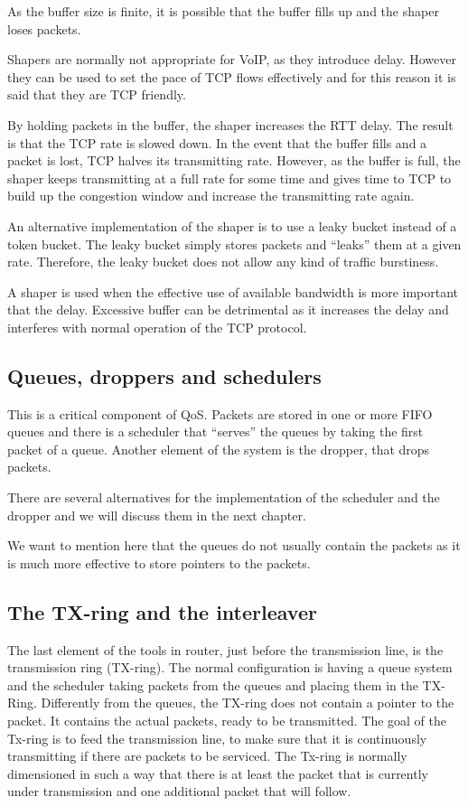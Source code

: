 As the buffer size is finite, it is possible that the buffer fills up and the shaper loses packets.

Shapers are normally not appropriate for VoIP, as they introduce delay.
However they can be used to set the pace of TCP flows effectively and for this reason it is said that they are TCP friendly.

By holding packets in the buffer, the shaper increases the RTT delay.
The result is that the TCP rate is slowed down.
In the event that the buffer fills and a packet is lost, TCP halves its transmitting rate.
However, as the buffer is full, the shaper keeps transmitting at a full rate for some time and gives time to TCP to build up the congestion window and increase the transmitting rate again.

An alternative implementation of the shaper is to use a leaky bucket instead of a token bucket.
The leaky bucket simply stores packets and ``leaks'' them at a given rate.
Therefore, the leaky bucket does not allow any kind of traffic burstiness.

A shaper is used when the effective use of available bandwidth is more important that the delay.
Excessive buffer can be detrimental as it increases the delay and interferes with normal operation of the TCP protocol.

\subsection{Queues, droppers and schedulers}

This is a critical component of QoS.
Packets are stored in one or more FIFO queues and there is a scheduler that ``serves'' the queues by taking the first packet of a queue.
Another element of the system is the dropper, that drops packets.

There are several alternatives for the implementation of the scheduler and the dropper and we will discuss them in the next chapter.

We want to mention here that the queues do not usually contain the packets as it is much more effective to store pointers to the packets.

\subsection{The TX-ring and the interleaver}
The last element of the tools in router, just before the transmission line, is the transmission ring (TX-ring).
The normal configuration is having a queue system and the scheduler taking packets from the queues and placing them in the TX-Ring.
Differently from the queues, the TX-ring does not contain a pointer to the packet.
It contains the actual packets, ready to be transmitted.
The goal of the Tx-ring is to feed the transmission line, to make sure that it is continuously transmitting if there are packets to be serviced.
The Tx-ring is normally dimensioned in such a way that there is at least the packet that is currently under transmission and one additional packet that will follow.

